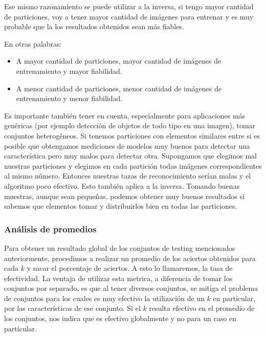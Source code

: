 Ese mismo razonamiento se puede utilizar a la inversa, si tengo mayor cantidad de particiones, voy a tener mayor cantidad de imágenes para entrenar y es muy probable que la los resultados obtenidos sean más fiables.

En otras palabras:

\begin{itemize}
    \item A mayor cantidad de particiones, mayor cantidad de imágenes de entrenamiento y mayor fiabilidad.
    \item A menor cantidad de particiones, menor cantidad de imágenes de entrenamiento y menor fiabilidad.
\end{itemize}

Es importante también tener en cuenta, especialmente para aplicaciones más genéricas (por ejemplo detección de objetos de todo tipo en una imagen), tomar conjuntos heterogéneos. Si tenemos particiones con elementos similares entre si es posible que obtengamos mediciones de modelos muy buenos para detectar una característica pero muy malos para detectar otra. Supongamos que elegimos mal nuestras particiones y elegimos en cada partición todas imágenes correspondientes al mismo número. Entonces nuestras tazas de reconocimiento serían malas y el algoritmo poco efectivo. Esto también aplica a la inversa. Tomando buenas muestras, aunque sean pequeñas, podemos obtener muy buenos resultados si sabemos que elementos tomar y distribuirlos bien en todas las particiones.

\subsubsection{Análisis de promedios}

Para obtener un resultado global de los conjuntos de testing mencionados anteriormente, procedimos a realizar un promedio de los aciertos obtenidos para cada $k$ y sacar el porcentaje de aciertos. A esto lo llamaremos, la tasa de efectividad.
La ventaja de utilizar esta metrica, a diferencia de tomar los conjuntos por separado, es que al tener diversos conjuntos, se mitiga el problema de conjuntos para los cuales es muy efectivo la utilización de un $k$ en particular, por las características de ese conjunto. Si el $k$ resulta efectivo en el promedio de los conjuntos, nos indica que es efectivo globalmente y no para un caso en particular.


